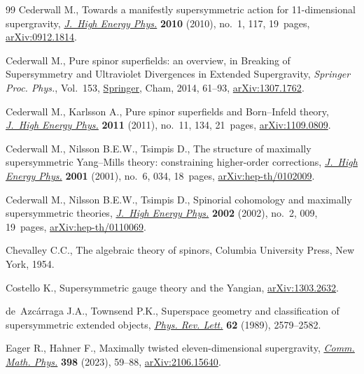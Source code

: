 \begin{thebibliography}{99}
Cederwall M., Towards a manifestly supersymmetric action for 11-dimensional
 supergravity, \href{https://doi.org/10.1007/JHEP01(2010)117}{\textit{J.~High Energy Phys.}} \textbf{2010} (2010), no.~1, 117,
 19~pages, \href{https://arxiv.org/abs/0912.1814}{arXiv:0912.1814}.

Cederwall M., Pure spinor superfields: an overview, in Breaking of
 Supersymmetry and Ultraviolet Divergences in Extended Supergravity,
 \textit{Springer Proc. Phys.}, Vol.~153, \href{https://doi.org/10.1007/978-3-319-03774-5_4}{Springer}, Cham,
 2014, 61--93, \href{https://arxiv.org/abs/1307.1762}{arXiv:1307.1762}.

Cederwall M., Karlsson A., Pure spinor superfields and {B}orn--{I}nfeld theory,
 \href{https://doi.org/10.1007/JHEP11(2011)134}{\textit{J.~High Energy Phys.}} \textbf{2011} (2011), no.~11, 134, 21~pages,
 \href{https://arxiv.org/abs/1109.0809}{arXiv:1109.0809}.

Cederwall M., Nilsson B.E.W., Tsimpis D., The structure of maximally
 supersymmetric {Y}ang--{M}ills theory: constraining higher-order corrections,
 \href{https://doi.org/10.1088/1126-6708/2001/06/034}{\textit{J.~High Energy Phys.}} \textbf{2001} (2001), no.~6, 034, 18~pages,
 \href{https://arxiv.org/abs/hep-th/0102009}{arXiv:hep-th/0102009}.

Cederwall M., Nilsson B.E.W., Tsimpis D., Spinorial cohomology and maximally
 supersymmetric theories, \href{https://doi.org/10.1088/1126-6708/2002/02/009}{\textit{J.~High Energy Phys.}} \textbf{2002} (2002),
 no.~2, 009, 19~pages, \href{https://arxiv.org/abs/hep-th/0110069}{arXiv:hep-th/0110069}.

Chevalley C.C., The algebraic theory of spinors, Columbia University Press, New
 York, 1954.

Costello K., Supersymmetric gauge theory and the {Y}angian, \href{https://arxiv.org/abs/1303.2632}{arXiv:1303.2632}.

de~Azc\'arraga J.A., Townsend P.K., Superspace geometry and classification of
 supersymmetric extended objects, \href{https://doi.org/10.1103/PhysRevLett.62.2579}{\textit{Phys. Rev. Lett.}} \textbf{62}
 (1989), 2579--2582.

Eager R., Hahner F., Maximally twisted eleven-dimensional supergravity,
 \href{https://doi.org/10.1007/s00220-022-04516-5}{\textit{Comm. Math. Phys.}} \textbf{398} (2023), 59--88, \href{https://arxiv.org/abs/2106.15640}{arXiv:2106.15640}.


\end{thebibliography}
